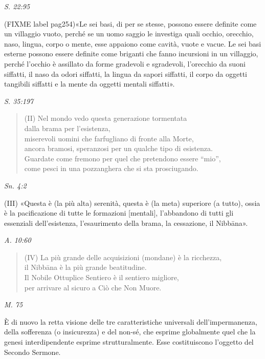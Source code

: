 \emph{S. 22:95}


(FIXME label pag254)«Le sei basi, di per se stesse, possono essere definite come un
villaggio vuoto, perché se un uomo saggio le investiga quali occhio,
orecchio, naso, lingua, corpo o mente, esse appaiono come cavità, vuote
e vacue. Le sei basi esterne possono essere definite come briganti che
fanno incursioni in un villaggio, perché l’occhio è assillato da forme
gradevoli e sgradevoli, l’orecchio da suoni siffatti, il naso da odori
siffatti, la lingua da sapori siffatti, il corpo da oggetti tangibili
siffatti e la mente da oggetti mentali siffatti».


\emph{S. 35:197}


\begin{quote}
(II) Nel mondo vedo questa generazione tormentata \\
dalla brama per l’esistenza, \\
miserevoli uomini che farfugliano di fronte alla Morte, \\
ancora bramosi, speranzosi per un qualche tipo di esistenza. \\
Guardate come fremono per quel che pretendono essere “mio”, \\
come pesci in una pozzanghera che si sta prosciugando.
\end{quote}

\emph{Sn. 4:2}


(III) «Questa è (la più alta) serenità, questa è (la meta) superiore (a
tutto), ossia è la pacificazione di tutte le formazioni [mentali],
l’abbandono di tutti gli essenziali dell’esistenza, l’esaurimento della
brama, la cessazione, il Nibbāna».


\emph{A. 10:60}


\begin{quote}
(IV) La più grande delle acquisizioni (mondane) è la ricchezza, \\
il Nibbāna è la più grande beatitudine. \\
Il Nobile Ottuplice Sentiero è il sentiero migliore, \\
per arrivare al sicuro a Ciò che Non Muore.
\end{quote}

\emph{M. 75}


 È di nuovo la retta visione delle tre caratteristiche
universali dell’impermanenza, della sofferenza (o insicurezza) e del
non-sé, che esprime globalmente quel che la genesi interdipendente
esprime strutturalmente. Esse costituiscono l’oggetto del Secondo
Sermone.


